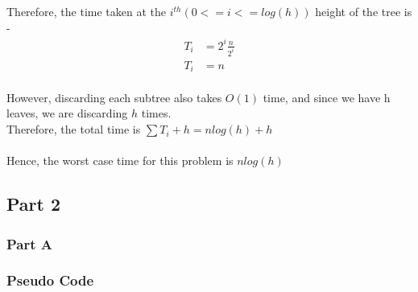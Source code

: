\documentclass{article}
\begin{document}
            \\
            \\
            Therefore, the time taken at the $i^{th} (0 <= i <= log(h))$ height of the tree is -
            \begin{align*}
                T_i &= 2^i\frac{n}{2^i} \\
                T_i &= n
            \end{align*}
            \\
            However, discarding each subtree also takes $O(1)$ time, and since we have h leaves, we are discarding $h$ times.
            \\
            Therefore, the total time is $\sum{T_i} + h = nlog(h) + h$
            \\
            \\
            Hence, the worst case time for this problem is $nlog(h)$
    
    
    \subsection*{Part 2}
    
        \subsubsection*{Part A}
    
            \subsubsection*{Pseudo Code}
            
\end{document}
